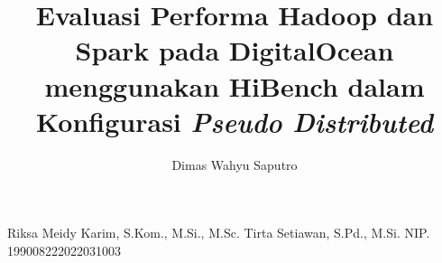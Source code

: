 \title{Evaluasi Performa Hadoop dan Spark pada DigitalOcean menggunakan HiBench dalam Konfigurasi \textit{Pseudo Distributed}} 	%
\author{Dimas Wahyu Saputro}		%
\dosbingB%
    {Riksa Meidy Karim, S.Kom., M.Si., M.Sc.}%
    {}				%
\dosbingA%
    {Tirta Setiawan, S.Pd., M.Si.}%
    {NIP. 199008222022031003}				%

\setcounter{page}{0}


%
%
%
%
%
%
%
%

\tableofcontents
{}
{%
    \let\oldnumberline\numberline%
    \renewcommand{\numberline}{\figurename~\oldnumberline}%
    \listoffigures%
}
{%
    \let\oldnumberline\numberline%
    \renewcommand{\numberline}{\tablename~\oldnumberline}%
    \listoftables%
}


\cleardoublepage


%